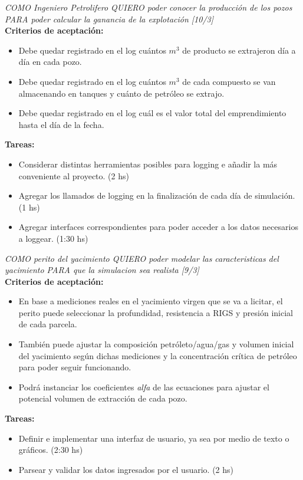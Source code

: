 \begin{tcolorbox}
\textit{COMO Ingeniero Petrolifero QUIERO poder conocer la producción de los pozos PARA poder calcular la ganancia de la explotación [10/3]}\\

\textbf{Criterios de aceptación:}
\begin{itemize}
	\item Debe quedar registrado en el log cuántos $m^3$ de producto se extrajeron día a día en cada pozo.
    \item Debe quedar registrado en el log cuántos $m^3$ de cada compuesto se van almacenando en tanques y cuánto de petróleo se extrajo. 
    \item Debe quedar registrado en el log cuál es el valor total del emprendimiento hasta el día de la fecha.  
\end{itemize}

\textbf{Tareas:}
\begin{itemize}
	\item Considerar distintas herramientas posibles para logging e añadir la más conveniente al proyecto. (2 hs) 
    \item Agregar los llamados de logging en la finalización de cada día de simulación. (1 hs)
    \item Agregar interfaces correspondientes para poder acceder a los datos necesarios a loggear. (1:30 hs)  
\end{itemize}
\end{tcolorbox}

\begin{tcolorbox}
\textit{COMO perito del yacimiento QUIERO poder modelar las caracteristicas del yacimiento PARA que la simulacion sea realista [9/3]}\\

\textbf{Criterios de aceptación:}
\begin{itemize}
	\item En base a mediciones reales en el yacimiento virgen que se va a licitar, el perito puede seleccionar la profundidad, resistencia a RIGS y presión inicial de cada parcela.

    \item También puede ajustar la composición petróleto/agua/gas y volumen inicial del yacimiento según dichas mediciones y la concentración crítica de petróleo para poder seguir funcionando.

    \item Podrá instanciar los coeficientes \textit{alfa} de las ecuaciones para ajustar el potencial volumen de extracción de cada pozo.
\end{itemize}

\textbf{Tareas:}
\begin{itemize}
	\item Definir e implementar una interfaz de usuario, ya sea por medio de texto o gráficos. (2:30 hs)
    \item Parsear y validar los datos ingresados por el usuario. (2 hs)
\end{itemize}
\end{tcolorbox}
